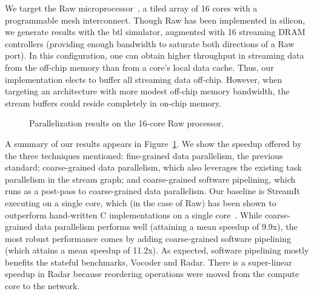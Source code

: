 We target the Raw microprocessor~\cite{raw10,raw}, a tiled array of 16
cores with a programmable mesh interconnect.  Though Raw has been
implemented in silicon, we generate results with the btl simulator,
augmented with 16 streaming DRAM controllers (providing enough
bandwidth to saturate both directions of a Raw port).  In this
configuration, one can obtain higher throughput in streaming data from
the off-chip memory than from a core's local data cache.  Thus, our
implementation elects to buffer all streaming data off-chip.  However,
when targeting an architecture with more modest off-chip memory
bandwidth, the stream buffers could reside completely in on-chip
memory.

\begin{figure}[t]
\centering
{}
\caption[Parallelization results]{Parallelization results on the
  16-core Raw processor.\protect\label{fig:par-results}}
\end{figure}

A summary of our results appears in Figure~\ref{fig:par-results}.  We
show the speedup offered by the three techniques mentioned:
fine-grained data parallelism, the previous standard; coarse-grained
data parallelism, which also leverages the existing task parallelism
in the stream graph; and coarse-grained software pipelining, which
runs as a post-pass to coarse-grained data parallelism.  Our baseline
is StreamIt executing on a single core, which (in the case of Raw) has
been shown to outperform hand-written C implementations on a single
core~\cite{raw_isca}.  While coarse-grained data parallelism performs
well (attaining a mean speedup of 9.9x), the most robust performance
comes by adding coarse-grained software pipelining (which attains a
mean speedup of 11.2x).  As expected, software pipelining mostly
benefits the stateful benchmarks, Vocoder and Radar.  There is a
super-linear speedup in Radar because reordering operations were moved
from the compute core to the network.




